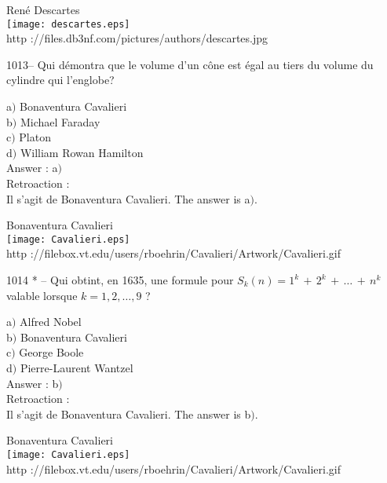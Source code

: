 ﻿\documentclass[letterpaper, 12pt]{article}
\begin{document}
        \begin{center}
        Ren\'e Descartes\\
    \texttt{[image: descartes.eps]}\\
        {\footnotesize http
://files.db3nf.com/pictures/authors/descartes.jpg}
    \end{center}

1013-- Qui d\'emontra que le volume d'un c\^one est \'egal au tiers
du volume du cylindre qui l'englobe?

a$)$ Bonaventura Cavalieri \\
b$)$ Michael Faraday \\
c$)$ Platon \\
d$)$ William Rowan Hamilton\\

Answer : a$)$\\

Retroaction : \\
Il s'agit de Bonaventura Cavalieri.
The answer is a$)$.\\

        \begin{center}
        Bonaventura Cavalieri\\
    \texttt{[image: Cavalieri.eps]}\\
        {\footnotesize http
://filebox.vt.edu/users/rboehrin/Cavalieri/Artwork/Cavalieri.gif}
    \end{center}

1014 * -- Qui obtint, en 1635, une formule pour
$S_k(n)=1^k\,+\,2^k\,+\,\ldots\,+\,n^k$ valable lorsque
$k=1,2,\ldots,9$ ?

a$)$ Alfred Nobel \\
b$)$ Bonaventura Cavalieri \\
c$)$ George Boole \\
d$)$ Pierre-Laurent Wantzel\\

Answer : b$)$\\

Retroaction : \\
Il s'agit de Bonaventura Cavalieri.
The answer is b$)$.\\

        \begin{center}
        Bonaventura Cavalieri\\
    \texttt{[image: Cavalieri.eps]}\\
        {\footnotesize http
://filebox.vt.edu/users/rboehrin/Cavalieri/Artwork/Cavalieri.gif}
    \end{center}
\end{document}
